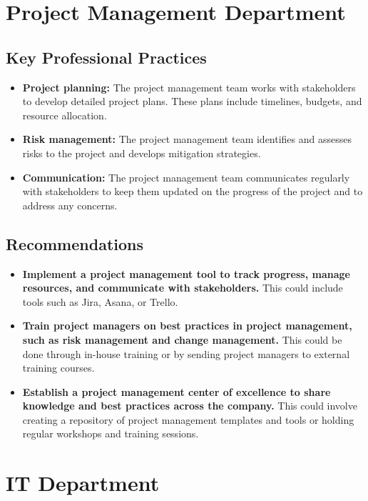 \documentclass{article}
\begin{document}
\section{Project Management Department}

\subsection{Key Professional Practices}

\begin{itemize}
  \item \textbf{Project planning:} The project management team works with stakeholders to develop detailed project plans. These plans include timelines, budgets, and resource allocation.
  \item \textbf{Risk management:} The project management team identifies and assesses risks to the project and develops mitigation strategies.
  \item \textbf{Communication:} The project management team communicates regularly with stakeholders to keep them updated on the progress of the project and to address any concerns.
\end{itemize}

\subsection{Recommendations}

\begin{itemize}
  \item \textbf{Implement a project management tool to track progress, manage resources, and communicate with stakeholders.} This could include tools such as Jira, Asana, or Trello.
  \item \textbf{Train project managers on best practices in project management, such as risk management and change management.} This could be done through in-house training or by sending project managers to external training courses.
  \item \textbf{Establish a project management center of excellence to share knowledge and best practices across the company.} This could involve creating a repository of project management templates and tools or holding regular workshops and training sessions.
\end{itemize}

\section{IT Department}
\end{document}
